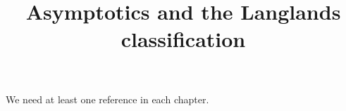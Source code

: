 

%


\title{Asymptotics and the Langlands classification}


\maketitle

\label{section-phantom}

\tableofcontents


We need at least one reference \cite{reference} in each chapter.















